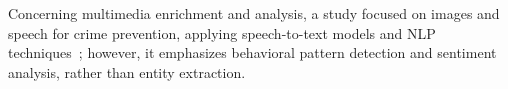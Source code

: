 

Concerning multimedia enrichment and analysis, a study focused on images and speech for crime prevention, applying speech-to-text models and NLP techniques~\cite{P_rez_2021}; however, it emphasizes behavioral pattern detection and sentiment analysis, rather than entity extraction.










